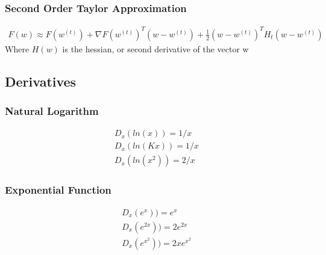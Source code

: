 \documentclass{article}
\begin{document}
\subsubsection{Second Order Taylor Approximation}
\begin{align*}
F(w) \approx F(w^{(t)}) + \nabla F(w^{(t)})^T(w-w^{(t)}) + \frac{1}{2}(w-w^{(t)})^T  H_t(w-w^{(t)})
\end{align*}
Where $H(w)$ is the hessian, or second derivative of the vector w

\subsection{Derivatives}
\subsubsection{Natural Logarithm}
\begin{align*}
D_x(ln(x)) = 1/x\\
D_x(ln(Kx)) = 1/x\\
D_x(ln(x^2)) = 2/x
\end{align*}

\subsubsection{Exponential Function}
\begin{align*}
D_x(e^x)) = e^x\\
D_x(e^{2x})) = 2e^{2x}\\
D_x(e^{x^2})) = 2xe^{x^2}
\end{align*}
\end{document}
